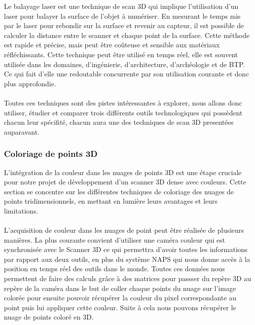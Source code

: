             \normalsize{
                Le balayage laser \cite{balayage_laser} est une technique de scan 3D qui implique l'utilisation d'un laser pour balayer la surface de l'objet à numériser. En mesurant le temps mis par le laser pour rebondir sur la surface et revenir au capteur, il est possible de calculer la distance entre le scanner et chaque point de la surface. Cette méthode est rapide et précise, mais peut être coûteuse et sensible aux matériaux réfléchissants. Cette technique peut être utilisé en temps réel, elle est souvent utilisée dans les domaines, d'ingénierie, d'architecture, d'archéologie et de BTP. Ce qui fait d'elle une redoutable concurrente par son utilisation courante et donc plus approfondie.
            }
            \\ \\
            \normalsize{
                Toutes ces techniques sont des pistes intéressantes à explorer, nous allons donc utiliser, étudier et comparer trois différents outils technologiques qui possèdent chacun leur spécifité, chacun aura une des techniques de scan 3D presentées auparavant.
            }
        
    \subsubsection{Coloriage de points 3D}
        \normalsize{
            L'intégration de la couleur dans les nuages de points 3D est une étape cruciale pour notre projet de développement d'un scanner 3D dense avec couleurs. Cette section se concentre sur les différentes techniques de coloriage des nuages de points tridimensionnels, en mettant en lumière leurs avantages et leurs limitations.
        }
        \\ \\
        \normalsize{
            L'acquisition de couleur dans les nuages de point peut être réalisée de plusieurs manières. La plus courante convient d'utiliser une caméra couleur qui est synchronisée avec le Scanner 3D ce qui permettra d'avoir toutes les informations par rapport aux deux outils, en plus du système NAPS qui nous donne accès à la position en temps réel des outils dans le monde. Toutes ces données nous permettent de faire des calculs grâce à des matrices pour passser du repère 3D au repère de la caméra dans le but de coller chaque points du nuage sur l'image colorée pour ensuite pouvoir récupérer la couleur du pixel correspondante au point puis lui appliquer cette couleur. Suite à cela nous pouvons récupérer le nuage de points coloré en 3D.
        }   
        
